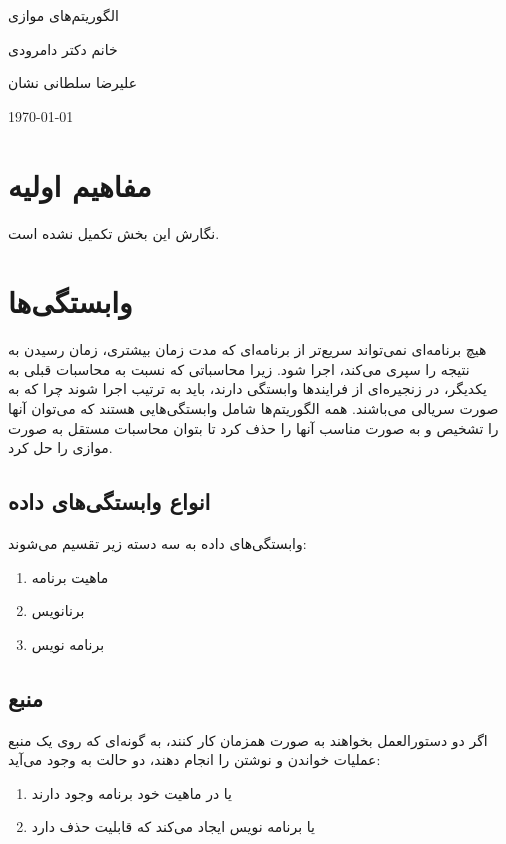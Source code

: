 \documentclass[20pt, a4paper]{article}
\begin{document}
\centerline{الگوریتم‌های موازی}
\centerline {خانم دکتر دامرودی}
\centerline{علیرضا سلطانی نشان}
\centerline{\today}

\tableofcontents

\section{مفاهیم اولیه}

نگارش این بخش تکمیل نشده است.

\section{وابستگی‌ها}

هیچ برنامه‌ای نمی‌تواند سریع‌تر از برنامه‌ای که مدت زمان بیشتری، زمان رسیدن به
نتیجه را سپری می‌‌کند، اجرا شود. زیرا محاسباتی که نسبت به محاسبات قبلی به
یکدیگر، در زنجیره‌ای از فرایند‌ها وابستگی دارند، باید به ترتیب اجرا شوند چرا که
به صورت سریالی می‌باشند.  همه الگوریتم‌ها شامل وابستگی‌هایی هستند که می‌توان
آنها را تشخیص و به صورت مناسب آنها را حذف کرد تا بتوان محاسبات مستقل به صورت
موازی را حل کرد.

\subsection{انواع وابستگی‌های داده}

وابستگی‌های داده به سه دسته زیر تقسیم می‌شوند:

\begin{enumerate}
    \item {} ماهیت برنامه
    \item {} برنانویس
    \item {} برنامه نویس
\end{enumerate}

\subsection{منبع} 

اگر دو دستورالعمل بخواهند به صورت همزمان کار کنند، به گونه‌ای که روی یک منبع
عملیات خواندن و نوشتن را انجام دهند، دو حالت به وجود می‌آید:

\begin{enumerate}
    \item یا در ماهیت خود برنامه وجود دارند
    \item یا برنامه نویس ایجاد می‌کند که قابلیت حذف دارد
\end{enumerate}
\end{document}
